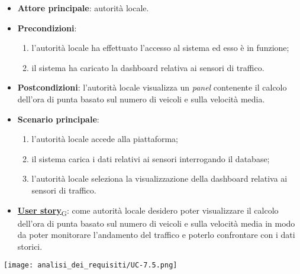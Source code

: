 \begin{itemize}
	\item \textbf{Attore principale}: autorità locale.
	\item \textbf{Precondizioni}:
	      \begin{enumerate}
		      \item l'autorità locale ha effettuato l'accesso al sistema ed esso è in funzione;
		      \item il sistema ha caricato la dashboard relativa ai sensori di traffico.
	      \end{enumerate}
	\item \textbf{Postcondizioni}: l'autorità locale visualizza un \textit{panel} contenente il calcolo dell'ora di punta basato sul numero di veicoli e sulla velocità media.
	\item \textbf{Scenario principale}:
	      \begin{enumerate}
		      \item l'autorità locale accede alla piattaforma;
		      \item il sistema carica i dati relativi ai sensori interrogando il database;
		      \item l'autorità locale seleziona la visualizzazione della dashboard relativa ai sensori di traffico.
	      \end{enumerate}
	\item \href{https://7last.github.io/docs/rtb/documentazione-interna/glossario\#user-story}{\textbf{User story}\textsubscript{G}}:
	      come autorità locale desidero poter visualizzare il calcolo dell'ora di punta basato sul numero di veicoli e sulla velocità media in modo da poter monitorare
	      l'andamento del traffico e poterlo confrontare con i dati storici.
\end{itemize}
\begin{center}
	\texttt{[image: analisi\_dei\_requisiti/UC-7.5.png]}
\end{center}

